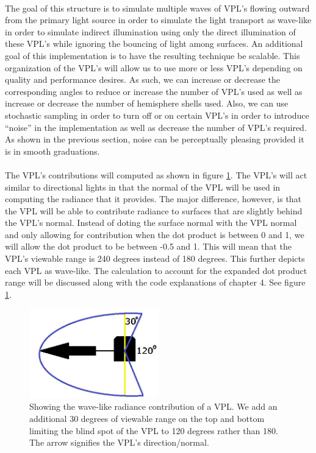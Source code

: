 \paragraph{}
The goal of this structure is to simulate multiple waves of VPL's flowing outward from the primary light source in order to simulate the light transport as wave-like in order to simulate indirect illumination using only the direct illumination of these VPL's while ignoring the bouncing of light among surfaces.  An additional goal of this implementation is to have the resulting technique be scalable.  This organization of the VPL's will allow us to use more or less VPL's depending on quality and performance desires.  As such, we can increase or decrease the corresponding angles to reduce or increase the number of VPL's used as well as increase or decrease the number of hemisphere shells used.  Also, we can use stochastic sampling in order to turn off or on certain VPL's in order to introduce ``noise'' in the implementation as well as decrease the number of VPL's required.  As shown in the previous section, noise can be perceptually pleasing provided it is in smooth graduations.

\paragraph{}
The VPL's contributions will computed as shown in figure \ref{fig:3.6}.  The VPL's will act similar to directional lights in that the normal of the VPL will be used in computing the radiance that it provides.  The major difference, however, is that the VPL will be able to contribute radiance to surfaces that are slightly behind the VPL's normal.  Instead of doting the surface normal with the VPL normal and only allowing for contribution when the dot product is between 0 and 1, we will allow the dot product to be between -0.5 and 1.  This will mean that the VPL's viewable range is 240 degrees instead of 180 degrees.  This further depicts each VPL as wave-like.  The calculation to account for the expanded dot product range will be discussed along with the code explanations of chapter 4.  See figure \ref{fig:3.6}.

\begin{figure}[h!]
  \centering
    \includegraphics[width=0.5\textwidth]{Figure36.jpg}
  \caption{Showing the wave-like radiance contribution of a VPL. We add an additional 30 degrees of viewable range on the top and bottom limiting the blind spot of the VPL to 120 degrees rather than 180. The arrow signifies the VPL's direction/normal.}
	\label{fig:3.6}
\end{figure}

